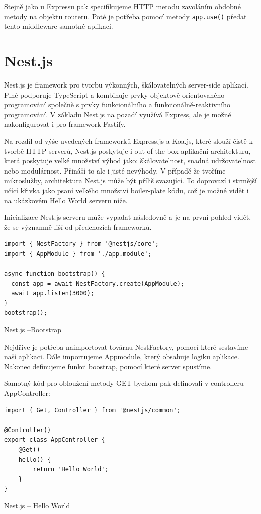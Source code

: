\documentclass[thesis=M,czech]{FITthesis}[2019/12/23]
\begin{document}
Stejně jako u Expressu pak specifikujeme HTTP metodu zavoláním obdobné metody na objektu routeru. Poté je potřeba pomocí metody \texttt{app.use()} předat tento middleware samotné aplikaci.

\section{Nest.js}
Nest.js je framework pro tvorbu výkonných, škálovatelných server-side aplikací. Plně podporuje TypeScript a kombinuje prvky objektově orientovaného programování společně s prvky funkcionálního a funkcionálně-reaktivního programování. V základu Nest.js na pozadí využívá Express, ale je možné nakonfigurovat i pro framework Fastify.

Na rozdíl od  výše uvedených frameworků Express.js a Koa.js, které slouží čistě k tvorbě HTTP serverů, Nest.js poskytuje i out-of-the-box aplikační architekturu, která poskytuje velké množství výhod jako: škálovatelnost, snadná udržovatelnost nebo modulárnost. Přináší to ale i jisté nevýhody. V případě že tvoříme mikroslužby, architektura Nest.js může být příliš svazující. To doprovazí i strmější učící křivka jako psaní velkého množství boiler-plate kódu, což je možné vidět i na ukázkovém Hello World serveru níže. 

Inicializace Nest.js serveru může vypadat následovně a je na první pohled vidět, že se významně liší od předchozích frameworků.

\begin{listing}[H]
\begin{verbatim}
import { NestFactory } from '@nestjs/core';
import { AppModule } from './app.module';

async function bootstrap() {
  const app = await NestFactory.create(AppModule);
  await app.listen(3000);
}
bootstrap();
\end{verbatim}
\caption{Nest.js --Bootstrap}
\label{lst:nest_bootstrap}
\end{listing}

Nejdříve je potřeba naimportovat továrnu NestFactory, pomocí které sestavíme naší aplikaci. Dále importujeme Appmodule, který obsahuje logiku aplikace. Nakonec definujeme funkci boostrap, pomocí které server spustíme.

Samotný kód pro obloužení metody GET bychom pak definovali v controlleru AppController:

\begin{listing}[H]
\begin{verbatim}
import { Get, Controller } from '@nestjs/common';

@Controller()
export class AppController {
    @Get()
    hello() {
        return 'Hello World';
    }
}
\end{verbatim}
\caption{Nest.js -- Hello World}
\label{lst:nest_hello}
\end{listing}
\end{document}
